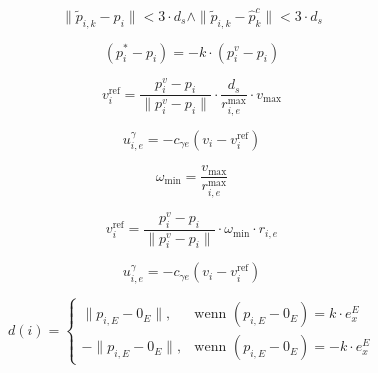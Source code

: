 \documentclass[conference]{IEEEtran}
\begin{document}
\begin{equation}
\| \tilde{p}_{i,k} - p_i \| < 3 \cdot d_s \wedge \| \tilde{p}_{i,k} - \hat{p}^c_k \| < 3 \cdot d_s
\label{eq:39}
\end{equation}

\begin{equation}
( p^*_i - p_i ) = -k \cdot ( p^v_i - p_i )
\label{eq:40}
\end{equation}

\begin{equation}
v^{\text{ref}}_i = \frac{p^v_i - p_i}{\| p^v_i - p_i \|} \cdot \frac{d_s}{r^{\text{max}}_{i,e}} \cdot v_{\text{max}}
\label{eq:41}
\end{equation}

\begin{equation}
u^{\gamma}_{i,e} = -c_{\gamma e} ( v_i - v^{\text{ref}}_i )
\label{eq:42}
\end{equation}

\begin{equation}
\omega_{\text{min}} = \frac{v_{\text{max}}}{r^{\text{max}}_{i,e}}
\label{eq:43}
\end{equation}

\begin{equation}
v^{\text{ref}}_i = \frac{p^v_i - p_i}{\| p^v_i - p_i \|} \cdot \omega_{\text{min}} \cdot r_{i,e}
\label{eq:44}
\end{equation}

\begin{equation}
u^{\gamma}_{i,e} = -c_{\gamma e} ( v_i - v^{\text{ref}}_i )
\label{eq:45}
\end{equation}

\begin{equation}
d(i) =
\begin{cases}
\| p_{i,E} - 0_E \|, & \text{wenn } (p_{i,E} - 0_E) = k \cdot e_x^E \\
-\| p_{i,E} - 0_E \|, & \text{wenn } (p_{i,E} - 0_E) = -k \cdot e_x^E
\end{cases}
\label{eq:46}
\end{equation}
\end{document}
